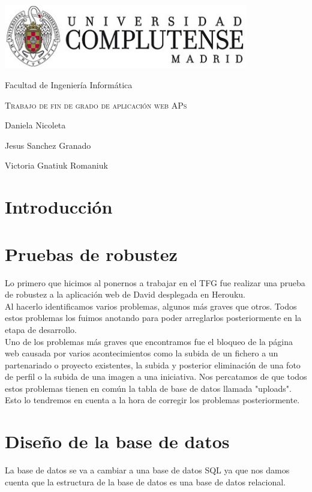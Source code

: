 \documentclass{report}
\begin{document}
\begin{titlepage}
	\centering
	{\includegraphics[width=0.8\textwidth]{logo}\par}
	\vspace{1cm}
	{\Large Facultad de Ingeniería Informática \par}
	\vspace{3cm}
	{\scshape\Huge Trabajo de  fin de grado de aplicación web APs \par}
	\vspace{3cm}
	{\Large Daniela Nicoleta \par}
	{\Large Jesus Sanchez Granado \par}
	{\Large Victoria Gnatiuk Romaniuk \par}
\end{titlepage}
\begin{abstract}
\end{abstract}
\section{Introducción}
\section{Pruebas de robustez}
Lo primero que hicimos al ponernos a trabajar en el TFG fue realizar una prueba de robustez a la aplicación web de David desplegada en Herouku.\\
Al hacerlo identificamos varios problemas, algunos más graves que otros. Todos estos problemas los fuimos anotando para poder arreglarlos posteriormente en la etapa de desarrollo.\\
Uno de los problemas más graves que encontramos fue el bloqueo de la página web causada por varios acontecimientos como la subida de un fichero a un partenariado o proyecto existentes, la subida y posterior eliminación de una foto de perfil o la subida de una imagen a una iniciativa. Nos percatamos de que todos estos problemas tienen en común la tabla de base de datos llamada "uploads". Esto lo tendremos en cuenta a la hora de corregir los problemas 
posteriormente.
\section{Diseño de la base de datos}
La base de datos se va a cambiar a una base de datos SQL ya que nos damos cuenta que la estructura de la base de datos es una base de datos relacional.


\end{document}
